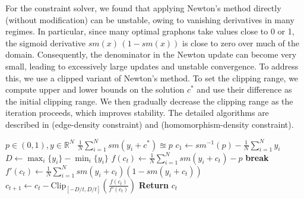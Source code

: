 \documentclass[11pt]{article}
\theoremstyle{plain}
\theoremstyle{definition}
\theoremstyle{remark}
\newcommand*{\R}{\mathbb{R}}
\begin{document}
For the constraint solver, we found that applying Newton's method directly (without modification) can be unstable, owing to vanishing derivatives in many regimes.
In particular, since many optimal graphons take values close to 0 or 1, the sigmoid derivative $\mathit{sm}(x)\,(1-\mathit{sm}(x))$ is close to zero over much of the domain.
Consequently, the denominator in the Newton update can become very small, leading to excessively large updates and unstable convergence.
To address this, we use a clipped variant of Newton's method. To set the clipping range, we compute upper and lower bounds on the solution $c^*$ and use their difference as the initial clipping range.
We then gradually decrease the clipping range as the iteration proceeds, which improves stability.
The detailed algorithms are described in  (edge-density constraint) and  (homomorphism-density constraint).

\begin{algorithm}
  \caption{Edge-Density Constraint Solver}\label{alg:cap}
  \begin{algorithmic}
    \REQUIRE $p \in (0, 1), y \in \R^N$
    \ENSURE $\frac{1}{N} \sum_{i=1}^N \mathit{sm}(y_i + c^*) \approxeq p$
    \STATE $c_1 \gets \mathit{sm}^{-1}(p) - \frac{1}{N} \sum_{i=1}^N y_i$ \hfill {}
    \STATE $D \gets \max_i \{y_i\} - \min_i \{y_i\}$ \hfill {}
      \STATE $f(c_t) \gets \frac{1}{N} \sum_{i=1}^N \mathit{sm}(y_i + c_t) - p$
        \STATE \textbf{break}
      \ENDIF
      \STATE $f'(c_t) \gets \frac{1}{N} \sum_{i=1}^N \mathit{sm}(y_i + c_t) (1 - \mathit{sm}(y_i + c_t))$
      \STATE $c_{t+1} \gets c_t - \mathrm{Clip}_{[-D/t, D/t]}\left(\frac{f(c_t)}{f'(c_t)}\right)$ \hfill {}
    \ENDFOR
    \STATE \textbf{Return} $c_t$
  \end{algorithmic}
\end{algorithm}
\end{document}
